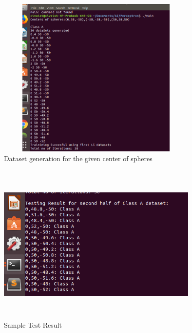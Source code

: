 \documentclass[letterpaper]{article}
\begin{document}
\begin{figure}[h]
\caption{Dataset generation for the given center of spheres}
\centering
\includegraphics[width=10cm,height=8cm]{Dataset_generation}
\end{figure}

\begin{figure}[h]
\caption{Sample Test Result}
\centering
\includegraphics[width=10cm,height=8cm]{test_result}
\end{figure}
 
\end{document}
